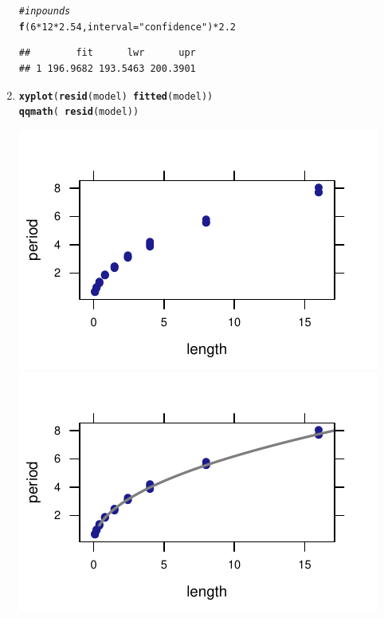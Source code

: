 \documentclass[twoside]{book}\usepackage[]{graphicx}\usepackage[]{xcolor}
\makeatletter
\def\maxwidth{ %
  \ifdim\Gin@nat@width>\linewidth
    \linewidth
  \else
    \Gin@nat@width
  \fi
}
\newcommand{\hlnum}[1]{\textcolor[rgb]{0.686,0.059,0.569}{#1}}%
\newcommand{\hlstr}[1]{\textcolor[rgb]{0.192,0.494,0.8}{#1}}%
\newcommand{\hlcom}[1]{\textcolor[rgb]{0.678,0.584,0.686}{\textit{#1}}}%
\newcommand{\hlopt}[1]{\textcolor[rgb]{0,0,0}{#1}}%
\newcommand{\hlstd}[1]{\textcolor[rgb]{0.345,0.345,0.345}{#1}}%
\newcommand{\hlkwc}[1]{\textcolor[rgb]{0.333,0.667,0.333}{#1}}%
\newcommand{\hlkwd}[1]{\textcolor[rgb]{0.737,0.353,0.396}{\textbf{#1}}}%
\newenvironment{kframe}{%
 \def\at@end@of@kframe{}%
 \ifinner\ifhmode%
  \def\at@end@of@kframe{\end{minipage}}%
  \begin{minipage}{\columnwidth}%
 \fi\fi%
 \def\FrameCommand##1{\hskip\@totalleftmargin \hskip-\fboxsep
 \colorbox{shadecolor}{##1}\hskip-\fboxsep
     \hskip-\linewidth \hskip-\@totalleftmargin \hskip\columnwidth}%
 \MakeFramed {\advance\hsize-\width
   \@totalleftmargin\z@ \linewidth\hsize
   \@setminipage}}%
 {\par\unskip\endMakeFramed%
 \at@end@of@kframe}
\newenvironment{knitrout}{}{} %
\makeatother
\begin{document}
\begin{solution}
\begin{enumerate}
\begin{knitrout}
\begin{kframe}
\begin{verbatim}
\end{verbatim}
\begin{alltt}
\hlcom{# in pounds}
\hlkwd{f}\hlstd{(}\hlnum{6} \hlopt{*} \hlnum{12} \hlopt{*} \hlnum{2.54}\hlstd{,} \hlkwc{interval} \hlstd{=} \hlstr{"confidence"}\hlstd{)} \hlopt{*} \hlnum{2.2}
\end{alltt}
\begin{verbatim}
##        fit      lwr      upr
## 1 196.9682 193.5463 200.3901
\end{verbatim}
\end{kframe}
\end{knitrout}
		\item
\begin{knitrout}
\color{fgcolor}\begin{kframe}
\begin{alltt}
\hlkwd{xyplot}\hlstd{(}\hlkwd{resid}\hlstd{(model)} \hlopt{~} \hlkwd{fitted}\hlstd{(model))}
\hlkwd{qqmath}\hlstd{(}\hlopt{~}\hlkwd{resid}\hlstd{(model))}
\end{alltt}
\end{kframe}

{\centering \includegraphics[width=\maxwidth]{figures/fig-unnamed-chunk-211-1} 
\includegraphics[width=\maxwidth]{figures/fig-unnamed-chunk-211-2} 

}
\end{knitrout}
\end{enumerate}
\end{solution}
\end{document}
